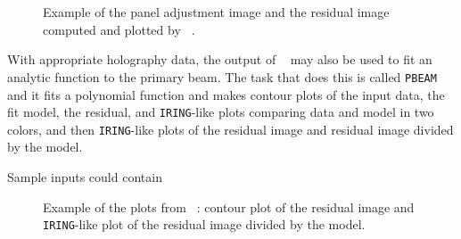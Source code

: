 \begin{figure}
\centering
{}
\caption[Example {\tt PANEL} images]{Example of the panel adjustment
image and the residual image computed and plotted by {\tt
{}}\@.}
\label{fig:panel}
\end{figure}

\vfill\eject

     With appropriate holography data, the output of {\tt
{}} may also be used to fit an analytic function to the
primary beam.  The task that does this is called {\tt PBEAM} and it
fits a polynomial function and makes contour plots of the input data,
the fit model, the residual, and {\tt IRING}-like plots comparing data
and model in two colors, and then {\tt IRING}-like plots of the
residual image and residual image divided by  the model.

Sample inputs could contain

\begin{figure}
\centering
{}
\caption[Example {\tt PBEAM} plots]{Example of the plots from {\tt
{}}: contour plot of the residual image and {\tt IRING}-like
plot of the residual image divided by the model.}
\label{fig:pbeam}
\end{figure}
